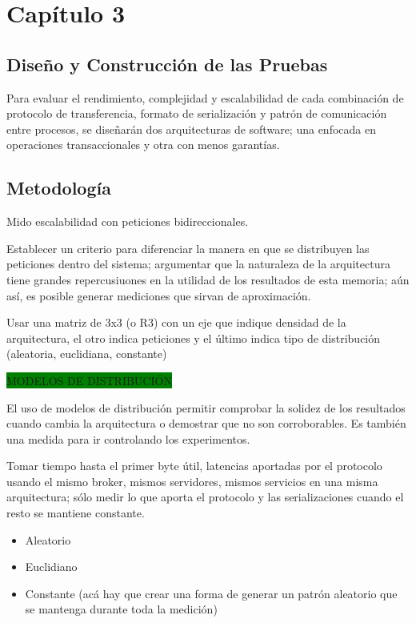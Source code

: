 \chapter{Capítulo 3}

\section{Diseño y Construcción de las Pruebas}

Para evaluar el rendimiento, complejidad y escalabilidad de cada combinación de protocolo de transferencia, formato de serialización y patrón de comunicación entre procesos, se diseñarán dos arquitecturas de software; una enfocada en operaciones transaccionales y otra con menos garantías.

\section{Metodología}

Mido escalabilidad con peticiones bidireccionales.

Establecer un criterio para diferenciar la manera en que se distribuyen las peticiones dentro del sistema; argumentar que la naturaleza de la arquitectura tiene grandes repercusiuones en la utilidad de los resultados de esta memoria; aún así, es posible generar mediciones que sirvan de aproximación.

Usar una matriz de 3x3 (o R3) con un eje que indique densidad de la arquitectura, el otro indica peticiones y el último indica tipo de distribución (aleatoria, euclidiana, constante)

\colorbox{green}{MODELOS DE DISTRIBUCIÓN}

El uso de modelos de distribución permitir comprobar la solidez de los resultados cuando cambia la arquitectura o demostrar que no son corroborables. Es también una medida para ir controlando los experimentos.

Tomar tiempo hasta el primer byte útil, latencias aportadas por el protocolo usando el mismo broker, mismos servidores, mismos servicios en una misma arquitectura; sólo medir lo que aporta el protocolo y las serializaciones cuando el resto se mantiene constante.

\begin{itemize}
  \item Aleatorio
  \item Euclidiano
  \item Constante (acá hay que crear una forma de generar un patrón aleatorio que se mantenga durante toda la medición)
\end{itemize}

